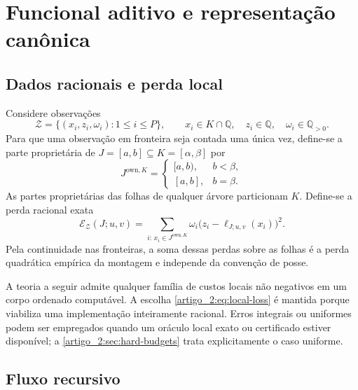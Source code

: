 \documentclass[12pt,a4paper]{article}
\theoremstyle{preciso}
\theoremstyle{definition}
\newcommand{\own}{\mathrm{own}}
\newcommand{\loss}{\mathcal{E}}
\theoremstyle{preciso}
\theoremstyle{preciso}
\theoremstyle{preciso}
\theoremstyle{preciso}
\theoremstyle{definition}
\theoremstyle{preciso}
\theoremstyle{definition}
\theoremstyle{preciso}
\theoremstyle{preciso}
\theoremstyle{definition}
\begin{document}
\section{Funcional aditivo e representação canônica}
\label{artigo_2:sec:functional}

\subsection{Dados racionais e perda local}

Considere observações
\begin{equation}
 \mathcal Z=\{(x_i,z_i,\omega_i):1\le i\le P\},
 \qquad
 x_i\in K\cap\mathbb Q,\quad z_i\in\mathbb Q,\quad
 \omega_i\in\mathbb Q_{>0}.
 \label{artigo_2:eq:rational-data}
\end{equation}
Para que uma observação em fronteira seja contada uma única vez, define-se a
parte proprietária de $J=[a,b]\subseteq K=[\alpha,\beta]$ por
\begin{equation}
 J^{\own,K}=
 \begin{cases}
 [a,b),&b<\beta,\\
 [a,b],&b=\beta.
 \end{cases}
 \label{artigo_2:eq:relative-ownership}
\end{equation}
As partes proprietárias das folhas de qualquer árvore particionam $K$.
Define-se a perda racional exata
\begin{equation}
 \loss_{\mathcal Z}(J;u,v)
 =\sum_{i:\,x_i\in J^{\own,K}}
 \omega_i\bigl(z_i-\ell_{J;u,v}(x_i)\bigr)^2.
 \label{artigo_2:eq:local-loss}
\end{equation}
Pela continuidade nas fronteiras, a soma dessas perdas sobre as folhas é a
perda quadrática empírica da montagem e independe da convenção de posse.

A teoria a seguir admite qualquer família de custos locais não negativos em um
corpo ordenado computável. A escolha \eqref{artigo_2:eq:local-loss} é mantida porque
viabiliza uma implementação inteiramente racional. Erros integrais ou uniformes
podem ser empregados quando um oráculo local exato ou certificado estiver
disponível; a \cref{artigo_2:sec:hard-budgets} trata explicitamente o caso uniforme.

\subsection{Fluxo recursivo}
\end{document}
